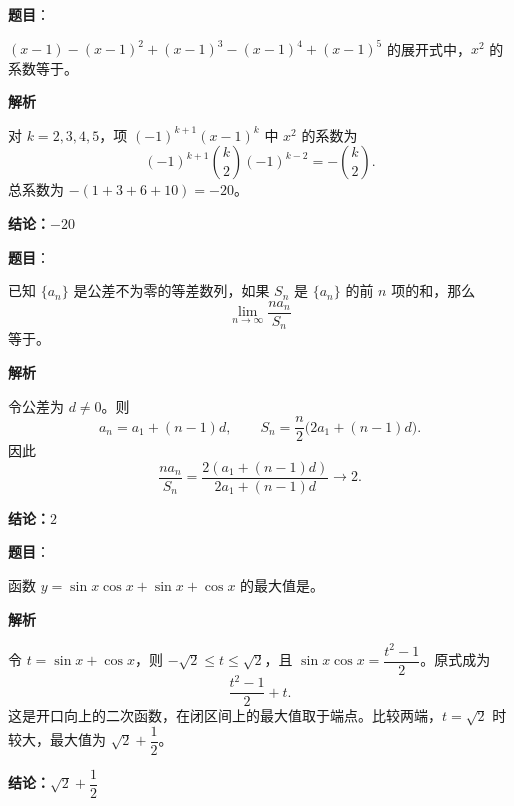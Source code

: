 \begin{answer}

\textbf{题目}：

$(x-1)-(x-1)^2+(x-1)^3-(x-1)^4+(x-1)^5$ 的展开式中，$x^2$ 的系数等于\gkblank{}。

\textbf{解析}

对 $k=2,3,4,5$，项 $(-1)^{k+1}(x-1)^k$ 中 $x^2$ 的系数为
\nopagebreak[4]
\[
(-1)^{k+1}\binom{k}{2}(-1)^{k-2}=-\binom{k}{2}.
\]
总系数为 $-(1+3+6+10)=-20$。

\textbf{结论：$-20$}


\end{answer}
\begin{answer}

\textbf{题目}：

已知 $\{a_n\}$ 是公差不为零的等差数列，如果 $S_n$ 是 $\{a_n\}$ 的前 $n$ 项的和，那么
\nopagebreak[4]
\[
\lim_{n\to\infty}\frac{na_n}{S_n}
\]
等于\gkblank{}。

\textbf{解析}

令公差为 $d\ne0$。则
\nopagebreak[4]
\[
a_n=a_1+(n-1)d,\qquad
S_n=\frac n2\bigl(2a_1+(n-1)d\bigr).
\]
因此
\nopagebreak[4]
\[
\frac{na_n}{S_n}
=\frac{2(a_1+(n-1)d)}{2a_1+(n-1)d}\longrightarrow 2.
\]

\textbf{结论：$2$}


\end{answer}
\begin{answer}

\textbf{题目}：

函数 $y=\sin x\cos x+\sin x+\cos x$ 的最大值是\gkblank{}。

\textbf{解析}

令 $t=\sin x+\cos x$，则 $-\sqrt2\le t\le\sqrt2$，且 $\sin x\cos x=\dfrac{t^2-1}{2}$。原式成为
\nopagebreak[4]
\[
\frac{t^2-1}{2}+t.
\]
这是开口向上的二次函数，在闭区间上的最大值取于端点。比较两端，$t=\sqrt2$ 时较大，最大值为 $\sqrt2+\dfrac12$。

\textbf{结论：$\sqrt2+\dfrac12$}


\end{answer}
